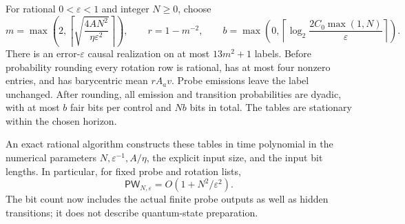 \begin{theorem}
\label{thm:adaptivecompiler59}
For rational $0<\varepsilon<1$ and integer $N\ge0$, choose
\begin{equation}\label{eq:adaptiveparameters59}
 m=\max\left(2,\left\lceil\sqrt{
                    \frac{4AN^2}{\eta\varepsilon^2}}\right\rceil\right),
 \qquad r=1-m^{-2},\qquad
 b=\max\left(0,\left\lceil\log_2
                 \frac{2C_0\max(1,N)}{\varepsilon}\right\rceil\right).
\end{equation}
There is an error-$\varepsilon$ causal realization on at most
$13m^2+1$ labels. Before probability rounding every rotation row is
rational, has at most four nonzero entries, and has barycentric mean
$rA_av$. Probe emissions leave the label unchanged. After rounding,
all emission and transition probabilities are dyadic, with at most $b$
fair bits per control and $Nb$ bits in total. The tables are stationary
within the chosen horizon.

An exact rational algorithm constructs these tables in time polynomial
in the numerical parameters $N,\varepsilon^{-1},A/\eta$, the explicit
input size, and the input bit lengths. In particular, for fixed probe
and rotation lists,
\begin{equation}\label{eq:adaptivewidth59}
                 \mathsf{PW}_{N,\varepsilon}
                    =O(1+N^2/\varepsilon^2).
\end{equation}
The bit count now includes the actual finite probe outputs as well as
hidden transitions; it does not describe quantum-state preparation.
\end{theorem}
